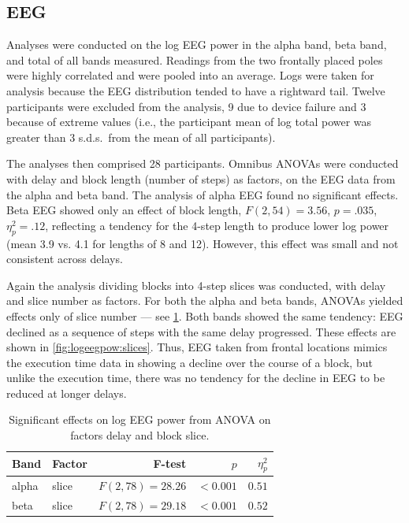 \documentclass[10pt,letterpaper]{article}
\begin{document}
\subsection{EEG}
Analyses were conducted on the log EEG power in the alpha band, beta band, and total of all bands measured.
Readings from the two frontally placed poles were highly correlated and were pooled into an average.
Logs were taken for analysis because the EEG distribution tended to have a rightward tail.
Twelve participants were excluded from the analysis, 9 due to device failure and 3 because of extreme values (i.e., the participant mean of log total power was greater than 3 s.d.s.\ from the mean of all participants).

The analyses then comprised 28 participants.\@
Omnibus ANOVAs were conducted with delay and block length (number of steps) as factors, on the EEG data from the alpha and beta band.
The analysis of alpha EEG found no significant effects.
Beta EEG showed only an effect of block length, \( F(2,54) = 3.56 \), \( p = .035 \), \( \eta^{2}_{p} = .12 \), reflecting a tendency for the 4-step length to produce lower log power (mean 3.9 vs. 4.1 for lengths of 8 and 12).
However, this effect was small and not consistent across delays.  

Again the analysis dividing blocks into 4-step slices was conducted, with delay and slice number as factors.  
For both the alpha and beta bands, ANOVAs  yielded effects only of slice number --- see \cref{tab:anova:egg:alphabeta}.
Both bands showed the same tendency:  EEG declined as a sequence of steps with the same delay progressed.
These effects are shown in \cref{fig:logeegpow:slices}.
Thus, EEG taken from frontal locations mimics the execution time data in showing a decline over the course of a block, but unlike the execution time, there was no tendency for the decline in EEG to be reduced at longer delays.

\begin{table}[h]
  \centering
  \caption{Significant effects on log EEG power from ANOVA on factors delay and block slice.}\label{tab:anova:egg:alphabeta}
  \setlength{\tabcolsep}{0pt} %
  \begin{tabular*}{\columnwidth}{@{\extracolsep{\fill}\quad}llrrr}
    \toprule
    \textbf{Band} & \textbf{Factor} & \textbf{F-test} & \textbf{\(p\)} & \textbf{\( \eta^{2}_{p} \)} \\ \midrule
    alpha   & slice & \( F(2, 78) = 28.26 \) & \( <0.001 \) & \( 0.51 \) \\ %
    beta    & slice & \( F(2, 78) = 29.18 \) & \( <0.001 \) & \( 0.52 \) \\ 
    \bottomrule
  \end{tabular*}
\end{table}
\end{document}
